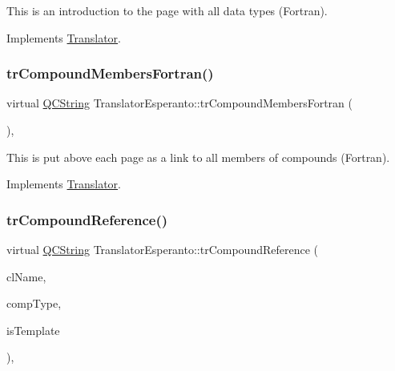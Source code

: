 This is an introduction to the page with all data types (Fortran). 

Implements \mbox{\hyperlink{class_translator}{Translator}}.

\mbox{\label{class_translator_esperanto_a1ed5571b1d73b6b5e41b9b964262391e}} 
\subsubsection{\texorpdfstring{trCompoundMembersFortran()}{trCompoundMembersFortran()}}
{\footnotesize\ttfamily virtual \mbox{\hyperlink{class_q_c_string}{Q\+C\+String}} Translator\+Esperanto\+::tr\+Compound\+Members\+Fortran (\begin{DoxyParamCaption}{ }\end{DoxyParamCaption})\hspace{0.3cm}{\ttfamily [inline]}, {\ttfamily [virtual]}}

This is put above each page as a link to all members of compounds (Fortran). 

Implements \mbox{\hyperlink{class_translator}{Translator}}.

\mbox{\label{class_translator_esperanto_a40137c7e2338707009b5734806153c67}} 
\subsubsection{\texorpdfstring{trCompoundReference()}{trCompoundReference()}}
{\footnotesize\ttfamily virtual \mbox{\hyperlink{class_q_c_string}{Q\+C\+String}} Translator\+Esperanto\+::tr\+Compound\+Reference (\begin{DoxyParamCaption}\item[{const char $\ast$}]{cl\+Name,  }\item[{\mbox{\hyperlink{class_class_def_ae70cf86d35fe954a94c566fbcfc87939}{Class\+Def\+::\+Compound\+Type}}}]{comp\+Type,  }\item[{bool}]{is\+Template }\end{DoxyParamCaption})\hspace{0.3cm}{\ttfamily [inline]}, {\ttfamily [virtual]}}

